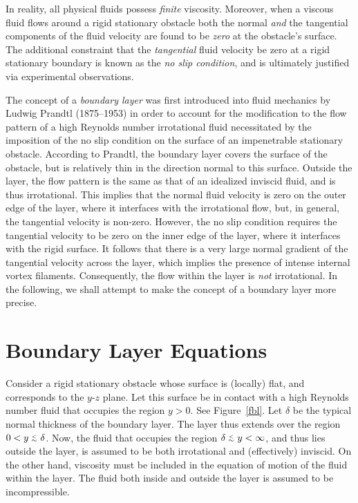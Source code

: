 In reality, all physical fluids possess {\em finite}\/ viscosity. Moreover, when a viscous fluid flows around a rigid   
stationary obstacle 
both the  normal {\em and}\/ the  tangential  components of the fluid velocity are found to be  {\em zero}\/ at the obstacle's surface. 
The additional constraint that the {\em tangential}\/ fluid velocity be zero at a rigid stationary boundary is known as the 
 {\em no slip condition}, and 
is  ultimately justified via experimental observations. 

The concept of a {\em boundary layer}\/ was first introduced into fluid mechanics by Ludwig Prandtl (1875--1953) in order to
account for the modification to the flow pattern of a high Reynolds number irrotational fluid necessitated  by the 
 imposition of the no slip condition on the  surface of an impenetrable stationary obstacle. According to Prandtl, the boundary layer covers the surface of the obstacle, but  is relatively thin in the direction normal to this 
 surface. Outside the layer, the  flow pattern is the same as  that of an idealized  inviscid fluid, and is thus
irrotational. This
implies that the normal fluid velocity is zero on the outer edge of the layer, where it interfaces with the irrotational
flow, but, in general, the
tangential velocity is non-zero. However, the no slip condition requires the tangential velocity to be zero on the inner edge 
of the layer, where it interfaces with the rigid surface. It follows that there is a very large normal gradient of the tangential
velocity across the layer, which implies the presence of intense internal vortex filaments. Consequently, the
flow within the layer is {\em not}\/ irrotational. In the following,
we shall attempt to make the concept of a boundary layer more precise. 

\section{Boundary Layer Equations}\label{sj6.3}
Consider a rigid stationary  obstacle whose surface is (locally) flat, and corresponds to the $y$-$z$ plane. Let this
surface be in contact with a  high Reynolds
number fluid that  occupies the region $y>0$. See Figure~\ref{fbl}. Let $\delta$ be the typical normal thickness of the boundary layer. 
The layer thus  extends over the region $0< y\stackrel {_{\normalsize<}}{_{\normalsize \sim}} \delta$. Now, the fluid that occupies the region $\delta\stackrel {_{\normalsize<}}{_{\normalsize \sim}} y<\infty$, 
and thus lies outside
the layer, is assumed to be both irrotational and (effectively) inviscid. On the other hand, viscosity must be included in the
equation of motion of the fluid  within the layer. The fluid both inside and outside the layer is assumed to
be incompressible. 

